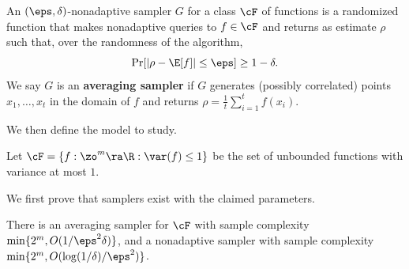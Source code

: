 \begin{definition}
An $(\eps,\delta)$-nonadaptive sampler $G$ for a 
%
class $\cF$ of functions  %
is a randomized function that makes nonadaptive queries to $f\in \cF$ and returns as estimate $\rho$ such that, over the randomness of the algorithm,
\[\Pr[|\rho-\E[f]|\leq \eps]\geq 1- \delta.\]
We say $G$ is an \textbf{averaging sampler} if $G$ generates (possibly correlated) points $x_1,\ldots,x_t$ in the domain of $f$ and returns $\rho=\frac{1}{t}\sum_{i=1}^tf(x_i)$.
\end{definition}
We then define the model to study.
\begin{definition}
Let $\cF=\{f:\zo^m\ra\R:\var(f)\leq 1\}$ be the set of unbounded functions with variance at most $1$.
\end{definition}
We first prove that samplers exist with the claimed parameters. 
\begin{proposition}
There is an averaging sampler for $\cF$ with sample complexity $\min\{2^m,O(1/\eps^2\delta)\}$, and a nonadaptive sampler with sample complexity $\min\{2^m,O(\log(1/\delta)/\eps^2)\}$.
\end{proposition}
